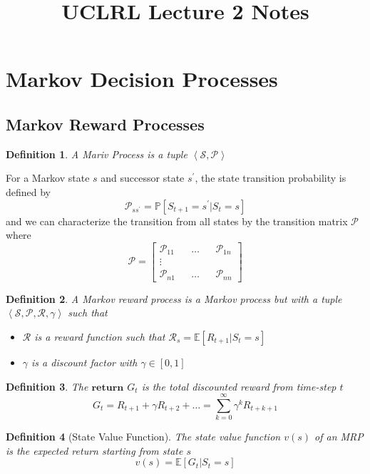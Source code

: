 \documentclass[a4paper,10pt]{article}
\title{UCLRL Lecture 2 Notes}
\author{}
\date{}
\newtheorem{defn}{Definition}
\begin{document}
\maketitle

\section{Markov Decision Processes}

\subsection{Markov Reward Processes}

\begin{defn}
 A Mariv Process is a tuple $\left< \mathcal{S}, \mathcal{P} \right>$
\end{defn}


For a Markov state $s$ and successor state $s^\prime$, the state transition probability is defined by 
$$
\mathcal{P}_{s s^\prime} = \mathbb{P} \left[ S_{t+1} = s^\prime | S_t = s \right]
$$
and we can characterize the transition from all states by the transition matrix $\mathcal{P}$ where 
$$
\mathcal{P} =
\begin{bmatrix}
 \mathcal{P}_{11} && \ldots && \mathcal{P}_{1n} \\
 \vdots \\
 \mathcal{P}_{n1} && \ldots && \mathcal{P}_{nn} 
\end{bmatrix}
$$

\begin{defn}
 A Markov reward process is a Markov process but with a tuple $\left< \mathcal{S}, \mathcal{P}, \mathcal{R}, \gamma \right>$ such that 
 \begin{itemize}
  \item $\mathcal{R}$ is a reward function such that $\mathcal{R}_s = \mathbb{E} \left[ R_{t+1} | S_t = s \right]$
  \item $\gamma$ is a discount factor with $\gamma \in \left[ 0, 1 \right]$
 \end{itemize}
\end{defn}

\begin{defn}
 The $\bm{return}$ $G_t$ is the total discounted reward from time-step $t$
 $$
 G_t = R_{t+1} + \gamma R_{t+2} + \ldots = \sum_{k=0}^\infty \gamma^k R_{t+k+1}
 $$
\end{defn}

\begin{defn}[State Value Function]
 The state value function $v(s)$ of an MRP is the expected return starting from state $s$
 $$
 v(s) = \mathbb{E} \left[ G_t | S_t = s \right]
 $$
\end{defn}
\end{document}
